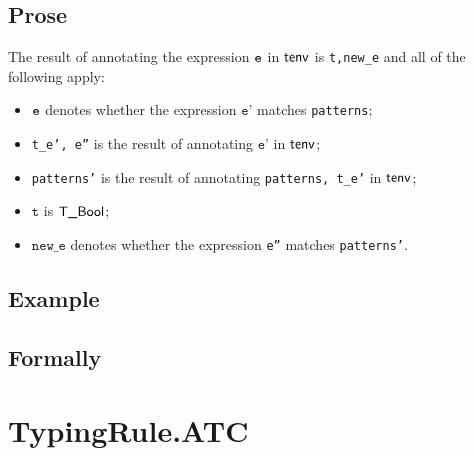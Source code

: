 \documentclass{book}
\newcommand\vt[0]{\texttt{t}}
\newcommand\newe[0]{\texttt{new\_e}}
\newcommand\vep[0]{\texttt{e'}}
\begin{document}
  \subsection{Prose}
  The result of annotating the expression $\texttt{e}$ in $\textsf{tenv}$ is
\texttt{t,new\_e} and all of the following apply:
  \begin{itemize}
  \item $\texttt{e}$ denotes whether the expression $\vep$ matches \texttt{patterns};
  \item \texttt{t\_e', e''} is the result of annotating $\vep$ in $\textsf{tenv}$;
  \item \texttt{patterns'} is the result of annotating \texttt{patterns, t\_e'} in $\textsf{tenv}$;
  \item $\vt$ is $\textsf{T\_Bool}$;
  \item $\newe$ denotes whether the expression \texttt{e''} matches \texttt{patterns'}.
  \end{itemize}

  \subsection{Example}



\begin{emptyformal}
    \subsection{Formally}
\end{emptyformal}


\section{TypingRule.ATC \label{sec:TypingRule.ATC}}
\end{document}
